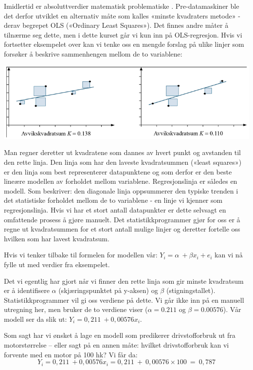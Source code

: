 \documentclass[
]{article}
\begin{document}
Imidlertid er absoluttverdier matematisk problematiske \citep{lovasStatistikkUniversiteterOg2013}. Pre-datamaskiner ble det derfor utviklet en alternativ måte som kalles «minste kvadraters metode» - derav begrepet OLS («Ordinary Least Squares»). Det finnes andre måter å tilnærme seg dette, men i dette kurset går vi kun inn på OLS-regresjon. Hvis vi fortsetter eksempelet over kan vi tenke oss en mengde forslag på ulike linjer som forsøker å beskrive sammenhengen mellom de to variablene:

\includegraphics{Teori_fig4.png}

Man regner deretter ut kvadratene som dannes av hvert punkt og avstanden til den rette linja. Den linja som har den laveste kvadratsummen («least squares») er den linja som best representerer datapunktene og som derfor er den beste lineære modellen av forholdet mellom variablene. Regresjonslinja er således en modell. Som \citet{thraneAppliedRegressionAnalysis2019} beskriver: den diagonale linja oppsummerer den typiske trenden i det statistiske forholdet mellom de to variablene - en linje vi kjenner som regresjonslinja.
Hvis vi har et stort antall datapunkter er dette selvsagt en omfattende prosess å gjøre manuelt. Det statistikkprogrammer gjør for oss er å regne ut kvadratsummen for et stort antall mulige linjer og deretter fortelle oss hvilken som har lavest kvadratsum.

Hvis vi tenker tilbake til formelen for modellen vår: \(Y_i=\alpha\:+\beta x_i+e_i\) kan vi nå fylle ut med verdier fra eksempelet.

Det vi egentlig har gjort når vi finner den rette linja som gir minste kvadratsum er å identifisere \(\alpha\) (skjæringspunktet på y-aksen) og \(\beta\) (stigningstallet). Statistikkprogrammer vil gi oss verdiene på dette. Vi går ikke inn på en manuell utregning her, men bruker de to verdiene \citet{lovasStatistikkUniversiteterOg2013} viser (\(\alpha=0.211\) og \(\beta=0.00576\)). Vår modell ser da slik ut: \(Y_i=0,211\:+0,00576x_i\).

Som sagt har vi ønsket å lage en modell som predikerer drivstofforbruk ut fra motorstørrelse -- eller sagt på en annen måte: hvilket drivstofforbruk kan vi forvente med en motor på 100 hk? Vi får da: \[Y_i=0,211\:+0,00576x_i=0,211\:+\:0,00576\times100\:=\:0,787\]
\end{document}
